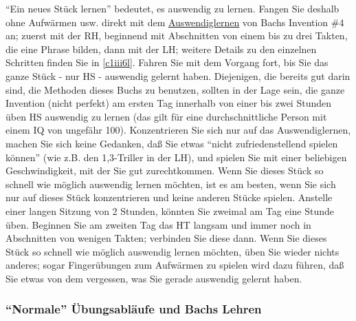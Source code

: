 \enquote{Ein neues Stück lernen} bedeutet, es auswendig zu lernen.
Fangen Sie deshalb ohne Aufwärmen usw. direkt mit dem \hyperref[c1iii6]{Auswendiglernen} von Bachs Invention \#4 an; zuerst mit der RH, beginnend mit Abschnitten von einem bis zu drei Takten, die eine Phrase bilden, dann mit der LH; weitere Details zu den einzelnen Schritten finden Sie in \hyperref[c1iii6l]{\autoref{c1iii6l}}.
Fahren Sie mit dem Vorgang fort, bis Sie das ganze Stück - nur HS - auswendig gelernt haben.
Diejenigen, die bereits gut darin sind, die Methoden dieses Buchs zu benutzen, sollten in der Lage sein, die ganze Invention (nicht perfekt) am ersten Tag innerhalb von einer bis zwei Stunden üben HS auswendig zu lernen (das gilt für eine durchschnittliche Person mit einem IQ von ungefähr 100).
Konzentrieren Sie sich nur auf das Auswendiglernen, machen Sie sich keine Gedanken, daß Sie etwas \enquote{nicht zufriedenstellend spielen können} (wie z.B. den 1,3-Triller in der LH), und spielen Sie mit einer beliebigen Geschwindigkeit, mit der Sie gut zurechtkommen.
Wenn Sie dieses Stück so schnell wie möglich auswendig lernen möchten, ist es am besten, wenn Sie sich nur auf dieses Stück konzentrieren und keine anderen Stücke spielen.
Anstelle einer langen Sitzung von 2 Stunden, könnten Sie zweimal am Tag eine Stunde üben.
Beginnen Sie am zweiten Tag das HT langsam und immer noch in Abschnitten von wenigen Takten; verbinden Sie diese dann.
Wenn Sie dieses Stück so schnell wie möglich auswendig lernen möchten, üben Sie wieder nichts anderes; sogar Fingerübungen zum Aufwärmen zu spielen wird dazu führen, daß Sie etwas von dem vergessen, was Sie gerade auswendig gelernt haben.


\subsubsection{\enquote{Normale} Übungsabläufe und Bachs Lehren}
\label{c1iii19c}  

